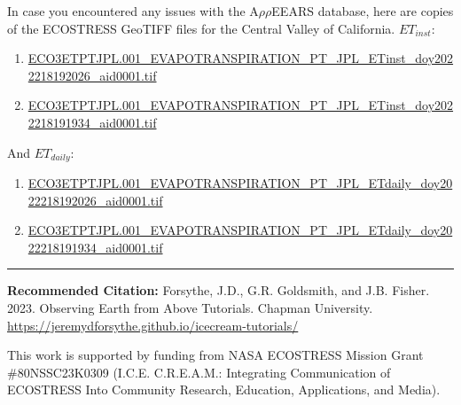 \documentclass[oneside,a4paper,11pt,explicit]{book}
\begin{document}
\begin{tcolorbox}[colback=yellow!5!white,title=\textbf{Datafiles}]
	\large
	In case you encountered any issues with the A$\rho\rho$EEARS database, here are copies of the ECOSTRESS GeoTIFF files for the Central Valley of California. $ET_{inst}$:
	\begin{enumerate}
		\item \href{https://jeremydforsythe.github.io/icecream-tutorials/Tutorial9_Evaportranspiration1/ECO3ETPTJPL.001_EVAPOTRANSPIRATION_PT_JPL_ETinst_doy2022218192026_aid0001.tif}{\small ECO3ETPTJPL.001\_EVAPOTRANSPIRATION\_PT\_JPL\_ETinst\_doy2022218192026\_aid0001.tif}
		\item \href{https://jeremydforsythe.github.io/icecream-tutorials/Tutorial9_Evaportranspiration1/ECO3ETPTJPL.001_EVAPOTRANSPIRATION_PT_JPL_ETinst_doy2022218191934_aid0001.tif}{\small ECO3ETPTJPL.001\_EVAPOTRANSPIRATION\_PT\_JPL\_ETinst\_doy2022218191934\_aid0001.tif}
	\end{enumerate}
	And $ET_{daily}$:
	\begin{enumerate}
		\item \href{https://jeremydforsythe.github.io/icecream-tutorials/Tutorial9_Evaportranspiration1/ECO3ETPTJPL.001_EVAPOTRANSPIRATION_PT_JPL_ETdaily_doy2022218192026_aid0001.tif}{\small ECO3ETPTJPL.001\_EVAPOTRANSPIRATION\_PT\_JPL\_ETdaily\_doy2022218192026\_aid0001.tif}
		\item \href{https://jeremydforsythe.github.io/icecream-tutorials/Tutorial9_Evaportranspiration1/ECO3ETPTJPL.001_EVAPOTRANSPIRATION_PT_JPL_ETdaily_doy2022218191934_aid0001.tif
}{\small ECO3ETPTJPL.001\_EVAPOTRANSPIRATION\_PT\_JPL\_ETdaily\_doy2022218191934\_aid0001.tif}
	\end{enumerate}
\end{tcolorbox}


\hrule

\vspace{1em}

\small \textbf{Recommended Citation:} Forsythe, J.D., G.R. Goldsmith, and J.B. Fisher. 2023. Observing Earth from Above Tutorials. Chapman University. \url{https://jeremydforsythe.github.io/icecream-tutorials/}

\vspace{1em}

This work is supported by funding from NASA ECOSTRESS Mission Grant \#80NSSC23K0309 (I.C.E. C.R.E.A.M.: Integrating Communication of ECOSTRESS Into Community Research, Education, Applications, and Media).
\end{document}
